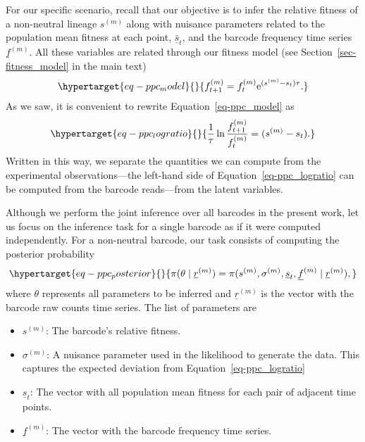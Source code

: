 \documentclass[
  letterpaper,
  DIV=11,
  numbers=noendperiod]{scrartcl}
\providecommand{\tightlist}{%
  \setlength{\itemsep}{0pt}\setlength{\parskip}{0pt}}\usepackage{longtable,booktabs,array}
\begin{document}
\begin{refsegment}
For our specific scenario, recall that our objective is to infer the
relative fitness of a non-neutral lineage \(s^{(m)}\) along with
nuisance parameters related to the population mean fitness at each
point, \(\underline{\bar{s}}_t\), and the barcode frequency time series
\(\underline{f}^{(m)}\). All these variables are related through our
fitness model (see Section~\ref{sec-fitness_model} in the main text)
\begin{equation}\protect\hypertarget{eq-ppc_model}{}{
f_{t+1}^{(m)} = f_{t}^{(m)} \mathrm{e}^{(s^{(m)} - s_t)\tau}.
}\label{eq-ppc_model}\end{equation} As we saw, it is convenient to
rewrite Equation~\ref{eq-ppc_model} as
\begin{equation}\protect\hypertarget{eq-ppc_logratio}{}{
\frac{1}{\tau}\ln\frac{f_{t+1}^{(m)}}{f_{t}^{(m)}} = (s^{(m)} - s_t).
}\label{eq-ppc_logratio}\end{equation} Written in this way, we separate
the quantities we can compute from the experimental observations---the
left-hand side of Equation~\ref{eq-ppc_logratio} can be computed from
the barcode reads---from the latent variables.

Although we perform the joint inference over all barcodes in the present
work, let us focus on the inference task for a single barcode as if it
were computed independently. For a non-neutral barcode, our task
consists of computing the posterior probability
\begin{equation}\protect\hypertarget{eq-ppc_posterior}{}{
\pi(\theta \mid \underline{r}^{(m)}) =
\pi(
    s^{(m)}, \sigma^{(m)}, \underline{s}_t, \underline{f}^{(m)}
    \mid \underline{r}^{(m)}
),
}\label{eq-ppc_posterior}\end{equation} where \(\theta\) represents all
parameters to be inferred and \(\underline{r}^{(m)}\) is the vector with
the barcode raw counts time series. The list of parameters are

\begin{itemize}
\tightlist
\item
  \(s^{(m)}\): The barcode's relative fitness.
\item
  \(\sigma^{(m)}\): A nuisance parameter used in the likelihood to
  generate the data. This captures the expected deviation from
  Equation~\ref{eq-ppc_logratio}
\item
  \(\underline{s}_t\): The vector with all population mean fitness for
  each pair of adjacent time points.
\item
  \(\underline{f}^{(m)}\): The vector with the barcode frequency time
  series.
\end{itemize}


\end{refsegment}
\end{document}
